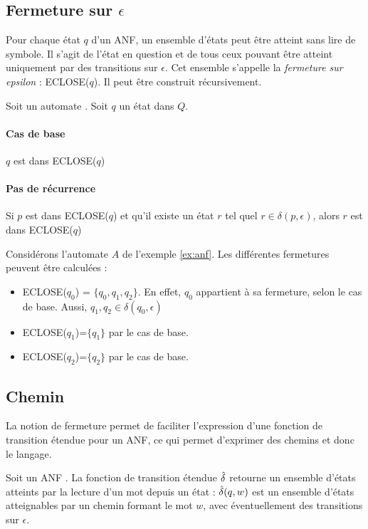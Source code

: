\subsection{Fermeture sur $\epsilon$}

Pour chaque état $q$ d'un ANF, un ensemble d'états peut être atteint sans lire de symbole. Il s'agit de l'état en question et de tous ceux pouvant être atteint uniquement par des transitions sur $\epsilon$. Cet ensemble s'appelle la \emph{fermeture sur epsilon} : ECLOSE($q$). Il peut être construit récursivement.

Soit un automate \automaton. Soit $q$ un état dans $Q$.

\paragraph{Cas de base} $q$ est dans ECLOSE($q$)

\paragraph{Pas de récurrence} Si $p$ est dans ECLOSE($q$) et qu'il existe un état $r$ tel quel $r\in\delta(p,\epsilon)$, alors $r$ est dans ECLOSE($q$)

\begin{exemple}\label{ex:anfclosure} Considérons l'automate $A$ de l'exemple \ref{ex:anf}. Les différentes fermetures peuvent être calculées :
	\begin{itemize}
		\item ECLOSE($q_0$) = $\{q_0,q_1,q_2\}$. En effet, $q_0$ appartient à sa fermeture, selon le cas de base. Aussi, $q_1,q_2\in\delta(q_0, \epsilon)$
		\item ECLOSE($q_1$)=$\{q_1\}$ par le cas de base.
		\item ECLOSE($q_2$)=$\{q_2\}$ par le cas de base.
	\end{itemize}
\end{exemple}


\subsection{Chemin}

La notion de fermeture permet de faciliter l'expression d'une fonction de transition étendue pour un ANF, ce qui permet d'exprimer des chemins et donc le langage.

Soit un ANF \automaton. La fonction de transition étendue $\hat{\delta}$ retourne un ensemble d'états atteints par la lecture d'un mot depuis un état : $\hat{\delta}(q,w)$ est un ensemble d'états atteignables par un chemin formant le mot $w$, avec éventuellement des transitions sur $\epsilon$.

